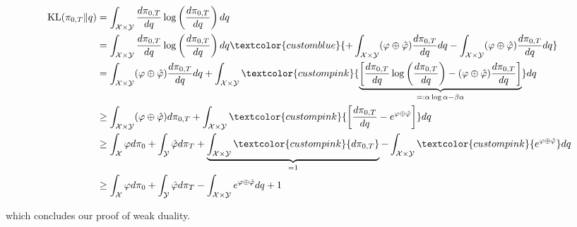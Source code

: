 \documentclass{article}
\newcommand{\bluetext}[1]{\textcolor{customblue}{#1}}
\newcommand{\pinktext}[1]{\textcolor{custompink}{#1}}
\begin{document}
\begin{small}
\begin{align}
    \text{KL}(\pi_{0,T}\|q)&=\int_{\mathcal{X}\times\mathcal{Y}}\frac{d\pi_{0,T}}{dq}\log \left(\frac{d\pi_{0,T}}{dq}\right)dq\nonumber\\
    &=\int_{\mathcal{X}\times\mathcal{Y}}\frac{d\pi_{0,T}}{dq}\log \left(\frac{d\pi_{0,T}}{dq}\right)dq\bluetext{+\int_{\mathcal{X}\times\mathcal{Y}}(\varphi\oplus \hat{\varphi})\frac{d\pi_{0,T}}{dq}dq-\int_{\mathcal{X}\times\mathcal{Y}}(\varphi\oplus \hat{\varphi})\frac{d\pi_{0,T}}{dq}dq}\nonumber\\
    &=\int_{\mathcal{X}\times\mathcal{Y}}(\varphi\oplus \hat{\varphi})\frac{d\pi_{0,T}}{dq}dq+\int_{\mathcal{X}\times\mathcal{Y}}\pinktext{\underbrace{\left[\frac{d\pi_{0,T}}{dq}\log \left(\frac{d\pi_{0,T}}{dq}\right)-(\varphi\oplus\hat{\varphi})\frac{d\pi_{0,T}}{dq}\right]}_{=:\alpha\log\alpha-\beta \alpha }}dq\nonumber\\
    &\geq\int_{\mathcal{X}\times\mathcal{Y}}(\varphi\oplus \hat{\varphi})d\pi_{0,T}+\int_{\mathcal{X}\times\mathcal{Y}}\pinktext{\left[\frac{d\pi_{0,T}}{dq}-e^{\varphi\oplus \hat{\varphi}}\right]}dq\nonumber\\
    &\geq \int_{\mathcal{X}}\varphi d\pi_0+\int_{\mathcal{Y}}\hat{\varphi} d\pi_T+\underbrace{\int_{\mathcal{X}\times\mathcal{Y}}\pinktext{d\pi_{0,T}}}_{=1}-\int_{\mathcal{X}\times\mathcal{Y}}\pinktext{e^{\varphi\oplus \hat{\varphi}}}dq\nonumber\\
    &\geq\int_{\mathcal{X}}\varphi d\pi_0+\int_{\mathcal{Y}}\hat{\varphi} d\pi_T-\int_{\mathcal{X}\times\mathcal{Y}}e^{\varphi\oplus \hat{\varphi}}dq+1
\end{align}
\end{small}
which concludes our proof of weak duality. 
\end{document}
